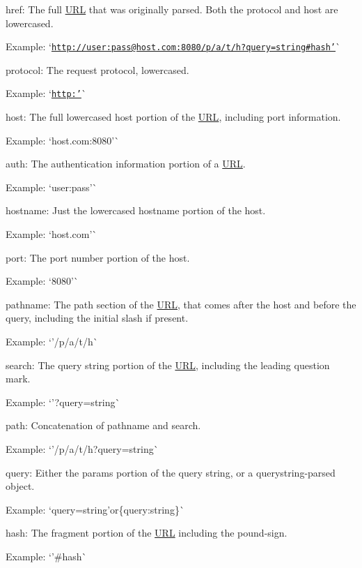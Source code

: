 \begin{DoxyItemize}
\item {\ttfamily href}\+: The full \mbox{\hyperlink{namespace_u_r_l}{U\+RL}} that was originally parsed. Both the protocol and host are lowercased.

Example\+: `\textquotesingle{}\href{http://user:pass@host.com:8080/p/a/t/h?query=string#hash&rsquo;}{\tt http\+://user\+:pass@host.\+com\+:8080/p/a/t/h?query=string\#hash'}\`{}
\item {\ttfamily protocol}\+: The request protocol, lowercased.

Example\+: `\textquotesingle{}\href{http:&rsquo;}{\tt http\+:'}\`{}
\item {\ttfamily host}\+: The full lowercased host portion of the \mbox{\hyperlink{namespace_u_r_l}{U\+RL}}, including port information.

Example\+: `\textquotesingle{}host.\+com\+:8080'\`{}
\item {\ttfamily auth}\+: The authentication information portion of a \mbox{\hyperlink{namespace_u_r_l}{U\+RL}}.

Example\+: `\textquotesingle{}user\+:pass'\`{}
\item {\ttfamily hostname}\+: Just the lowercased hostname portion of the host.

Example\+: `\textquotesingle{}host.\+com'\`{}
\item {\ttfamily port}\+: The port number portion of the host.

Example\+: `\textquotesingle{}8080'\`{}
\item {\ttfamily pathname}\+: The path section of the \mbox{\hyperlink{namespace_u_r_l}{U\+RL}}, that comes after the host and before the query, including the initial slash if present.

Example\+: `'/p/a/t/h\textquotesingle{}\`{}
\item {\ttfamily search}\+: The \textquotesingle{}query string\textquotesingle{} portion of the \mbox{\hyperlink{namespace_u_r_l}{U\+RL}}, including the leading question mark.

Example\+: `'?query=string\textquotesingle{}\`{}
\item {\ttfamily path}\+: Concatenation of {\ttfamily pathname} and {\ttfamily search}.

Example\+: `'/p/a/t/h?query=string\textquotesingle{}\`{}
\item {\ttfamily query}\+: Either the \textquotesingle{}params\textquotesingle{} portion of the query string, or a querystring-\/parsed object.

Example\+: `\textquotesingle{}query=string'{\ttfamily or}\{\textquotesingle{}query\textquotesingle{}\+:\textquotesingle{}string\textquotesingle{}\}\`{}
\item {\ttfamily hash}\+: The \textquotesingle{}fragment\textquotesingle{} portion of the \mbox{\hyperlink{namespace_u_r_l}{U\+RL}} including the pound-\/sign.

Example\+: `'\#hash\textquotesingle{}\`{}
\end{DoxyItemize}

